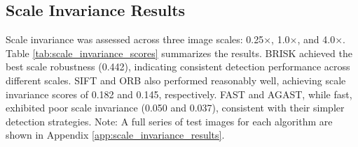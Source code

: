 \documentclass[journal]{IEEEtran}
\begin{document}
\begin{figure}[h]
    \centering
\end{figure}

\subsection{Scale Invariance Results}
Scale invariance was assessed across three image scales: 0.25$\times$, 1.0$\times$, and 4.0$\times$. Table \ref{tab:scale_invariance_scores} summarizes the results. BRISK achieved the best scale robustness (0.442), indicating consistent detection performance across different scales. SIFT and ORB also performed reasonably well, achieving scale invariance scores of 0.182 and 0.145, respectively. FAST and AGAST, while fast, exhibited poor scale invariance (0.050 and 0.037), consistent with their simpler detection strategies.
Note: A full series of test images for each algorithm are shown in Appendix \ref{app:scale_invariance_results}. \\
\end{document}
